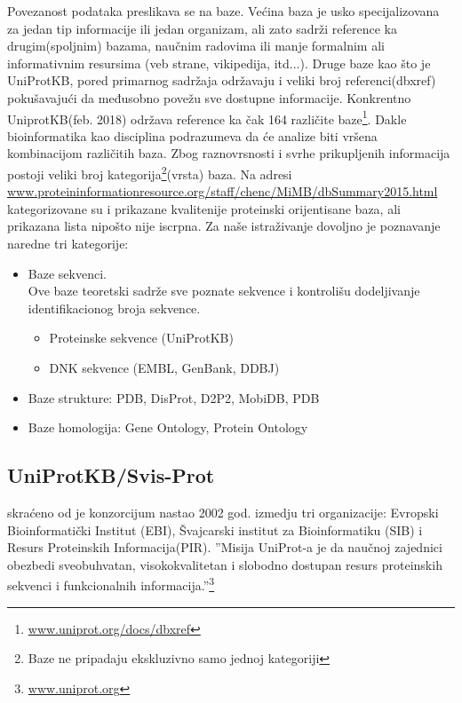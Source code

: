 Povezanost podataka preslikava se na baze. Većina baza je usko specijalizovana
za jedan tip informacije ili jedan organizam, ali zato sadrži reference ka
drugim(spoljnim) bazama, naučnim radovima ili  manje formalnim ali
informativnim resursima (veb strane, vikipedija, itd...). Druge baze kao što je
UniProtKB, pored primarnog sadržaja održavaju i veliki broj referenci(dbxref)
pokušavajući da međusobno povežu sve dostupne informacije. Konkrentno
UniprotKB(feb. 2018) održava reference ka čak 164 različite
baze\footnote{\url{www.uniprot.org/docs/dbxref}}.
Dakle bioinformatika kao disciplina podrazumeva da će analize biti vršena
kombinacijom različitih baza.  Zbog raznovrsnosti i svrhe prikupljenih
informacija postoji veliki broj kategorija\footnote{Baze ne pripadaju
ekskluzivno samo jednoj kategoriji}(vrsta) baza.  Na adresi
\url{www.proteininformationresource.org/staff/chenc/MiMB/dbSummary2015.html}
kategorizovane su i prikazane kvalitenije proteinski orijentisane baza, ali
prikazana lista nipošto nije iscrpna\parencite{Chen2017}. Za naše istraživanje
dovoljno je poznavanje naredne tri kategorije:

\begin{itemize}
  \item Baze sekvenci.\\ 
        Ove baze teoretski sadrže sve poznate sekvence i kontrolišu dodeljivanje 
        identifikacionog broja sekvence.
    \begin{itemize}
      \item Proteinske sekvence (UniProtKB)
      \item DNK sekvence (EMBL, GenBank, DDBJ)
    \end{itemize}
  \item Baze strukture: PDB, DisProt, D2P2, MobiDB, PDB
  \item Baze homologija: Gene Ontology, Protein Ontology
\end{itemize}


\subsection{UniProtKB/Svis-Prot}


 skraćeno od  je konzorcijum
nastao 2002 god. izmedju tri organizacije: Evropski Bioinformatički
Institut (EBI), Švajcarski institut za Bioinformatiku (SIB) i Resurs
Proteinskih Informacija(PIR).  ''Misija UniProt-a je da naučnoj zajednici
obezbedi sveobuhvatan, visokokvalitetan i slobodno dostupan resurs proteinskih
sekvenci i funkcionalnih informacija.''\footnote{\url{www.uniprot.org}} 


